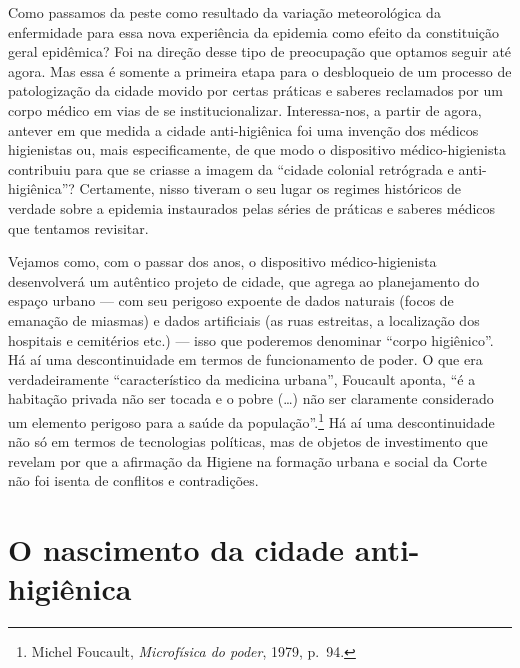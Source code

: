Como passamos da peste como resultado da variação meteorológica da
enfermidade para essa nova experiência da epidemia como efeito da
constituição geral epidêmica? Foi na direção desse tipo de preocupação
que optamos seguir até agora. Mas essa é somente a primeira etapa para o
desbloqueio de um processo de patologização da cidade movido por certas
práticas e saberes reclamados por um corpo médico em vias de se
institucionalizar. Interessa-nos, a partir de agora, antever em que
medida a cidade anti-higiênica foi uma invenção dos médicos higienistas
ou, mais especificamente, de que modo o dispositivo médico-higienista
contribuiu para que se criasse a imagem da ``cidade colonial retrógrada
e anti-higiênica''? Certamente, nisso tiveram o seu lugar os regimes
históricos de verdade sobre a epidemia instaurados pelas séries de
práticas e saberes médicos que tentamos revisitar.

Vejamos como, com o passar dos anos, o dispositivo médico-higienista
desenvolverá um autêntico projeto de cidade, que agrega ao planejamento
do espaço urbano --- com seu perigoso expoente de dados naturais (focos
de emanação de miasmas) e dados artificiais (as ruas estreitas, a
localização dos hospitais e cemitérios etc.) --- isso que poderemos
denominar ``corpo higiênico''. Há aí uma descontinuidade em termos de
funcionamento de poder. O que era verdadeiramente ``característico da
medicina urbana'', Foucault aponta, ``é a habitação privada não ser
tocada e o pobre (\ldots{}) não ser claramente considerado um elemento
perigoso para a saúde da população''.\footnote{Michel Foucault,
  \textit{Microfísica do poder}, 1979, p.~94.} Há aí uma descontinuidade
não só em termos de tecnologias políticas, mas de objetos de
investimento que revelam por que a afirmação da Higiene na formação
urbana e social da Corte não foi isenta de conflitos e contradições.

\chapter{O nascimento da cidade
anti-higiênica}

